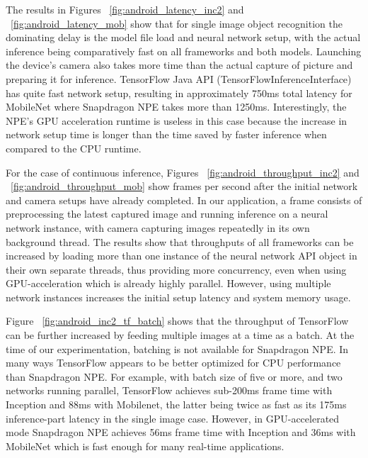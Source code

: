 \documentclass[sigconf]{acmart}
\begin{document}
The results in Figures ~\ref{fig:android_latency_inc2} and ~\ref{fig:android_latency_mob} show that for single image object recognition the dominating delay is the model file load and neural network setup, with the actual inference being comparatively fast on all frameworks and both models. Launching the device's camera also takes more time than the actual capture of picture and preparing it for inference. TensorFlow Java API (TensorFlowInferenceInterface) has quite fast network setup, resulting in approximately 750ms total latency for MobileNet where Snapdragon NPE takes more than 1250ms. Interestingly, the NPE's GPU acceleration runtime is useless in this case because the increase in network setup time is longer than the time saved by faster inference when compared to the CPU runtime.

For the case of continuous inference, Figures ~\ref{fig:android_throughput_inc2} and ~\ref{fig:android_throughput_mob} show frames per second after the initial network and camera setups have already completed. In our application, a frame consists of preprocessing the latest captured image and running inference on a neural network instance, with camera capturing images repeatedly in its own background thread. The results show that throughputs of all frameworks can be increased by loading more than one instance of the neural network API object in their own separate threads, thus providing more concurrency, even when using GPU-acceleration which is already highly parallel. However, using multiple network instances increases the initial setup latency and system memory usage.

Figure ~\ref{fig:android_inc2_tf_batch} shows that the throughput of TensorFlow can be further increased by feeding multiple images at a time as a batch. At the time of our experimentation, batching is not available for Snapdragon NPE. In many ways TensorFlow appears to be better optimized for CPU performance than Snapdragon NPE. For example, with batch size of five or more, and two networks running parallel, TensorFlow achieves sub-200ms frame time with Inception and 88ms with Mobilenet, the latter being twice as fast as its 175ms inference-part latency in the single image case. However, in GPU-accelerated mode Snapdragon NPE achieves 56ms frame time with Inception and 36ms with MobileNet which is fast enough for many real-time applications.
\end{document}
